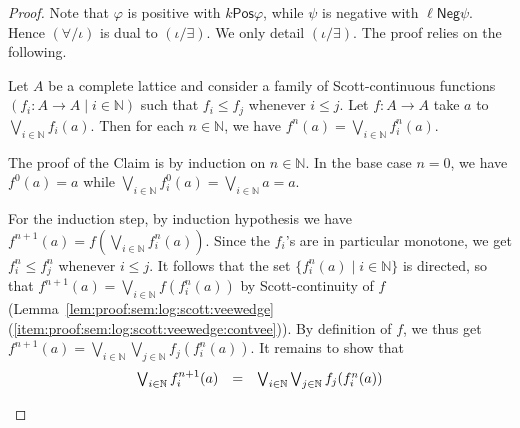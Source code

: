\documentclass[%
  a4paper,
  UKenglish,
  cleveref,
  autoref,
  thm-restate,
  numberwithinsect,
]{lipics-v2021}
\newcommand\NN{\mathbb{N}}
\newcommand\ax[1]{(\mathsf{#1})}
\newcommand\term[1]{\mathsf{#1}}
\newcommand\itvar{k}
\newcommand\itvarbis{\ell}
\newcommand\Pos{\mathrel{\term{Pos}}}
\newcommand\Neg{\mathrel{\term{Neg}}}
\newcommand\fingen{\iota}
\begin{document}
\begin{proof}
Note that $\varphi$ is positive with $\itvar \Pos \varphi$,
while $\psi$ is negative with $\itvarbis \Neg \psi$.
Hence $\ax{\forall/\fingen}$ is dual to $\ax{\fingen/\exists}$.
We only detail $\ax{\fingen/\exists}$.
The proof relies on the following.

\begin{claim}
Let $A$ be a complete lattice and consider a family
of Scott-continuous functions $(f_i \colon A \to A \mid i \in \NN)$
such that $f_i \leq f_j$ whenever $i \leq j$.
Let $f \colon A \to A$ take $a$ to $\bigvee_{i \in \NN}f_i(a)$.
Then for each $n \in \NN$, we have $f^n(a) = \bigvee_{i \in \NN} f^n_i(a)$.
\end{claim}

\begin{claimproof}
%
The proof of the Claim is by induction on $n \in \NN$.
In the base case $n = 0$,
we have $f^0(a) = a$
while $\bigvee_{i\in \NN} f_i^0(a) = \bigvee_{i \in \NN} a = a$.

For the induction step, by induction hypothesis we have
$f^{n+1}(a) = f(\bigvee_{i \in \NN} f_i^n(a))$.
Since the $f_i$'s are in particular monotone,
we get $f^n_i \leq f^n_j$ whenever $i \leq j$.
It follows that the set $\{f^n_i(a) \mid i \in \NN \}$ is directed,
so that
$f^{n+1}(a) = \bigvee_{i \in \NN} f(f^n_i(a))$
by Scott-continuity of $f$
(Lemma~\ref{lem:proof:sem:log:scott:veewedge}%
(\ref{item:proof:sem:log:scott:veewedge:contvee})).
%
By definition of $f$, we thus get
$f^{n+1}(a) = \bigvee_{i \in \NN} \bigvee_{j \in \NN} f_j(f_i^n(a))$.
It remains to show that
\[
\begin{array}{l l l}
  \bigvee_{i \in \NN} f_i^{n+1}(a)
& =
& \bigvee_{i \in \NN}\bigvee_{j \in \NN} f_j(f_i^n(a))
\end{array}
\]


\end{claimproof}
\end{proof}
\end{document}
